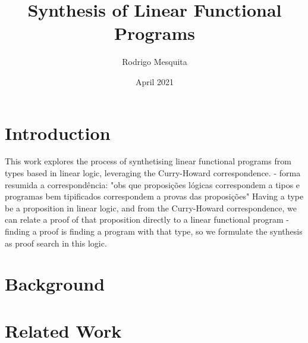 \documentclass{llncs}
\title{Synthesis of Linear Functional Programs}
\author{Rodrigo Mesquita}
\date{April 2021}
\institute{NOVA School of Science and Technology}
\begin{document}
\maketitle

\section{Introduction}

This work explores the process of synthetising linear functional programs from types based in linear logic, leveraging the Curry-Howard correspondence.
- forma resumida a correspondência: "obs que proposições lógicas correspondem a tipos e programas bem tipificados correspondem a provas das proposições"
Having a type be a proposition in linear logic, and from the Curry-Howard correspondence, we can relate a proof of that proposition directly to a linear functional program - finding a proof is finding a program with that type, so we formulate the synthesis as proof search in this logic.


\section{Background}

\section{Related Work}
    


\end{document}
